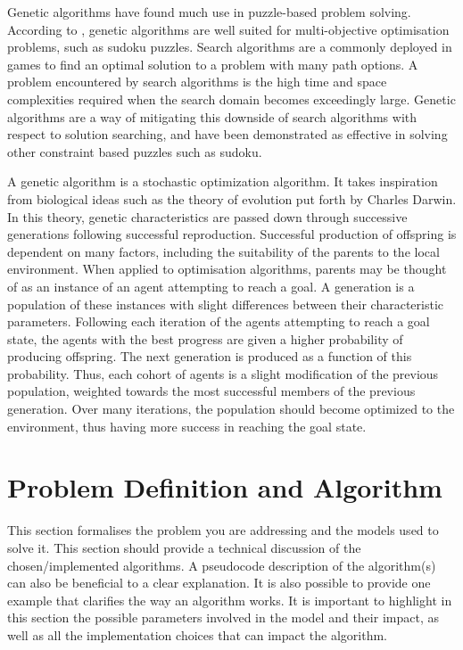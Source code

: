 \documentclass{svproc}
\begin{document}
Genetic algorithms have found much use in puzzle-based problem solving. According to \cite{geneticAlgo}, genetic algorithms are well suited for multi-objective optimisation problems, such as sudoku puzzles. Search algorithms are a commonly deployed in games to find an optimal solution to a problem with many path options. A problem encountered by search algorithms is the high time and space complexities required when the search domain becomes exceedingly large. Genetic algorithms are a way of mitigating this downside of search algorithms with respect to solution searching, and have been demonstrated as effective in solving other constraint based puzzles such as sudoku.

A genetic algorithm is a stochastic optimization algorithm. It takes inspiration from biological ideas such as the theory of evolution put forth by Charles Darwin. In this theory, genetic characteristics are passed down through successive generations following successful reproduction. Successful production of offspring is dependent on many factors, including the suitability of the parents to the local environment. When applied to optimisation algorithms, parents may be thought of as an instance of an agent attempting to reach a goal. A generation is a population of these instances with slight differences between their characteristic parameters. Following each iteration of the agents attempting to reach a goal state, the agents with the best progress are given a higher probability of producing offspring. The next generation is produced as a function of this probability. Thus, each cohort of agents is a slight modification of the previous population, weighted towards the most successful members of the previous generation. Over many iterations, the population should become optimized to the environment, thus having more success in reaching the goal state. 



\section{Problem Definition and Algorithm}
This section formalises the problem you are addressing and the models used to solve it. This section should provide a technical discussion of the chosen/implemented algorithms. A pseudocode description of the algorithm(s) can also be beneficial to a clear explanation. It is also possible to provide one example that clarifies the way an algorithm works. It is important to highlight in this section the possible parameters involved in the model and their impact, as well as all the implementation choices that can impact the algorithm.
\end{document}
